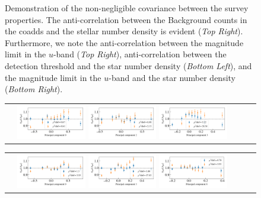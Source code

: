 \documentclass[fleqn,usenatbib,useAMS]{mnras}
\begin{document}
\begin{figure}
\begin{tabular}{cc}
\end{tabular}
\caption{\label{fig:sys_sys_correlation} Demonstration of the non-negligible covariance between the survey properties. The anti-correlation between the Background counts in the coadds and the stellar number density is evident (\textit{Top Right}). Furthermore, we note the anti-correlation between the magnitude limit in the $u$-band (\textit{Top Right}), anti-correlation between the detection threshold and the star number density (\textit{Bottom Left}), and the magnitude limit in the $u$-band and the star number density (\textit{Bottom Right}).} 
\end{figure}


\begin{figure}
\begin{tabular}{ccc}
\includegraphics[width=0.3\textwidth]{figures_tmp/sys/result_pca_ngal_0_15_0_poly_1.png}
\includegraphics[width=0.3\textwidth]{figures_tmp/sys/result_pca_ngal_0_15_2_poly_1.png}
\includegraphics[width=0.3\textwidth]{figures_tmp/sys/result_pca_ngal_0_15_3_poly_1.png}
\end{tabular}

\begin{tabular}{ccc}
\includegraphics[width=0.3\textwidth]{figures_tmp/sys/result_pca_ngal_0_3_0_poly_1.png}
\includegraphics[width=0.3\textwidth]{figures_tmp/sys/result_pca_ngal_0_3_3_poly_1.png}
\includegraphics[width=0.3\textwidth]{figures_tmp/sys/result_pca_ngal_0_3_8_poly_1.png}
\end{tabular}


\end{figure}
\end{document}

